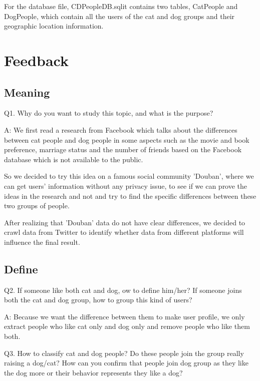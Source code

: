 \documentclass[12pt]{article}
\begin{document}
For the database file, CDPeopleDB.sqlit contains two tables, CatPeople and DogPeople, which contain all the users of the cat and dog groups and their geographic location information.

\section{Feedback}
\subsection{Meaning}
Q1. Why do you want to study this topic, and what is the purpose?

A: We first read a research from Facebook\cite{lada} which talks about the differences between cat people and dog people in some aspects such as the movie and book preference, marriage status and the number of friends based on the Facebook database which is not available to the public.

So we decided to try this idea on a famous social community 'Douban', where we can get users' information without any privacy issue, to see if we can prove the ideas in the research and not and try to find the specific differences between these two groups of people.

After realizing that 'Douban' data do not have clear differences, we decided to crawl data from Twitter to identify whether data from different platforms will influence the final result.

\subsection{Define}

Q2. If someone like both cat and dog, ow to define him/her? If someone joins both the cat and dog group, how to group this kind of users?

A: Because we want the difference between them to make user profile, we only extract people who like cat only and dog only and remove people who like them both.

Q3. How to classify cat and dog people? Do these people join the group really raising a dog/cat? How can you confirm that people join dog group as they like the dog more or their behavior represents they like a dog?
\end{document}
